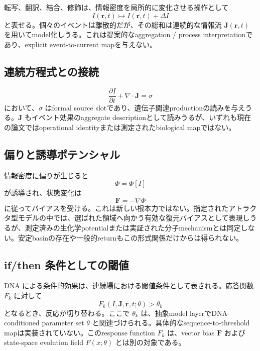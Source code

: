 \documentclass[11pt]{ltjsarticle}
\newcommand{\I}{I}
\newcommand{\J}{\mathbf{J}}
\newcommand{\PhiI}{\Phi}
\begin{document}
転写、翻訳、結合、修飾は、情報密度を局所的に変化させる操作として
\begin{equation}
  \I(\mathbf{r},t)\mapsto \I(\mathbf{r},t)+\Delta\I
\end{equation}
と表せる。個々のイベントは離散的だが、その総和は連続的な情報流 \(\J(\mathbf{r},t)\) を用いてmodel化しうる。これは提案的なaggregation / process interpretationであり、explicit event-to-current mapを与えない。

\subsection{連続方程式との接続}

\begin{equation}
  \frac{\partial \I}{\partial t}+\nabla\cdot\J=\sigma
\end{equation}
において、\(\sigma\) はformal source slotであり、遺伝子関連productionの読みを与えうる。\(\J\) もイベント効果のaggregate descriptionとして読みうるが、いずれも現在の論文ではoperational identityまたは測定されたbiological mapではない。

\subsection{偏りと誘導ポテンシャル}

情報密度に偏りが生じると
\begin{equation}
  \PhiI=\PhiI[\I]
\end{equation}
が誘導され、状態変化は
\begin{equation}
  \mathbf{F}=-\nabla\PhiI
\end{equation}
に従ってバイアスを受ける。これは新しい根本力ではない。指定されたアトラクタ型モデルの中では、選ばれた領域へ向かう有効な復元バイアスとして表現しうるが、測定済みの生化学potentialまたは実証された分子mechanismとは同定しない。安定basinの存在や一般的returnもこの形式関係だけからは得られない。

\subsection{if/then 条件としての閾値}

DNA による条件的効果は、連続場における閾値条件として表される。応答関数 \(F_k\) に対して
\begin{equation}
  F_k(\I,\J,\mathbf{r},t;\theta)>\theta_k
\end{equation}
となるとき、反応が切り替わる。ここで \(\theta_k\) は、抽象model layerでDNA-conditioned parameter set \(\theta\) と関連づけられる。具体的なsequence-to-threshold mapは実装されていない。このresponse function \(F_k\) は、vector bias \(\mathbf{F}\) およびstate-space evolution field \(F(x;\theta)\) とは別の対象である。
\end{document}
